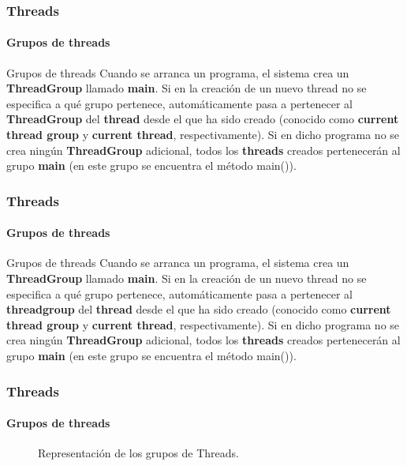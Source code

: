 \documentclass{beamer}
\begin{document}
    \begin{frame}
		\frametitle{Threads}
		\framesubtitle{Grupos de threads}

        \begin{block}{Grupos de threads} 
            Cuando se arranca un programa, el sistema crea un \textbf{ThreadGroup} llamado \textbf{main}. Si en la creaci\'on de un nuevo thread no se especifica a qu\'e grupo pertenece, autom\'aticamente pasa a pertenecer al \textbf{ThreadGroup} del \textbf{thread} desde el que ha sido creado (conocido como \textbf{current thread group} y \textbf{current thread}, respectivamente). Si en dicho programa no se crea ning\'un \textbf{ThreadGroup} adicional, todos los \textbf{threads} creados pertenecer\'an al grupo \textbf{main} (en este grupo se encuentra el m\'etodo main()).
        \end{block}
	\end{frame}

    \begin{frame}
		\frametitle{Threads}
		\framesubtitle{Grupos de threads}

        \begin{block}{Grupos de threads} 
            Cuando se arranca un programa, el sistema crea un \textbf{ThreadGroup} llamado \textbf{main}. Si en la creaci\'on de un nuevo thread no se especifica a qu\'e grupo pertenece, autom\'aticamente pasa a pertenecer al \textbf{threadgroup} del \textbf{thread} desde el que ha sido creado (conocido como \textbf{current thread group} y \textbf{current thread}, respectivamente). Si en dicho programa no se crea ning\'un \textbf{ThreadGroup} adicional, todos los \textbf{threads} creados pertenecer\'an al grupo \textbf{main} (en este grupo se encuentra el m\'etodo main()).
        \end{block}
	\end{frame}

    \begin{frame}
		\frametitle{Threads}
		\framesubtitle{Grupos de threads}

        \begin{center}
            \begin{figure}
                \caption{Representaci\'on de los grupos de Threads.}
            \end{figure}
	    \end{center}
	\end{frame}
\end{document}
